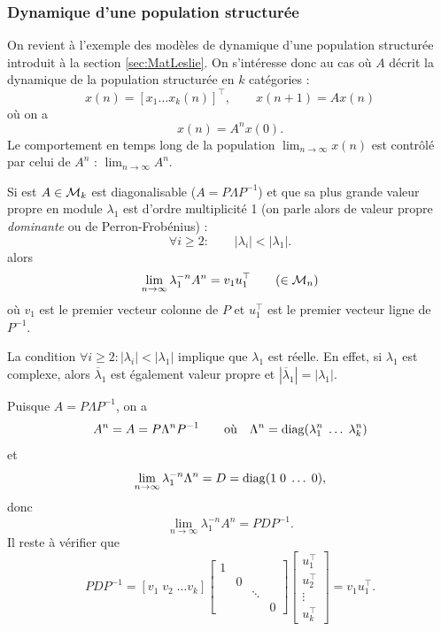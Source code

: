 \subsubsection{Dynamique d'une population structurée}

On revient à l'exemple des modèles de dynamique d'une population structurée introduit à la section \ref{sec:MatLeslie}. On s'intéresse donc au cas où $A$ décrit la dynamique de la population structurée en $k$ catégories : 
$$
x(n) = [x_1 \dots x_k(n)]^\top, \qquad x(n+1) = A x(n)
$$
où on a
$$
x(n) = A^n x(0).
$$
Le comportement en temps long de la population $\lim_{n \to\infty} x(n)$ est contrôlé par celui de $A^n$ : $\lim_{n \to\infty} A^n$.

\begin{proposition}
  Si est $A \in \mathcal{M}_k$ est diagonalisable ($A = P \Lambda P^{-1}$) et que sa plus grande valeur propre en module $\lambda_1$ est d'ordre multiplicité 1 (on parle alors de valeur propre {\em dominante} ou de Perron-Frobénius) :
  $$
  \forall i \geq 2: \qquad |\lambda_i| < |\lambda_1|.
  $$
  alors
  $$
  \lim_{n \to \infty} \lambda_1^{-n} A^n = v_1 u_1^\top \qquad (\in \mathcal{M}_n)
  $$
  où $v_1$ est le premier vecteur colonne de $P$ et $u_1^\top$ est le premier vecteur ligne de $P^{-1}$.
\end{proposition}

\remark
La condition $\forall i \geq 2: |\lambda_i| < |\lambda_1|$ implique que $\lambda_1$ est réelle. En effet, si $\lambda_1$ est complexe, alors $\overline{\lambda}_1$ est également valeur propre et $|\overline{\lambda}_1| = |\lambda_1|$.

\proof
  Puisque $A = P \Lambda P^{-1}$, on a
  $$
  A^n = A = P \Lambda^n P^{-1}
  \qquad \text{où} \quad 
  \Lambda^n = \operatorname{diag}(\lambda_1^n \; \dots \; \lambda_k^n)
  $$
  et 
  $$
  \lim_{n \to \infty} \lambda_1^{-n} \Lambda^n = D = \operatorname{diag}(1 \; 0 \; \dots \; 0),
  $$
  donc
  $$
  \lim_{n \to \infty} \lambda_1^{-n} A^n = P D P^{-1}.
  $$
  Il reste à vérifier que
  $$
  P D P^{-1} 
  = \left[v_1 \; v_2 \; \dots v_k\right] 
  \left[\begin{array}{cccc} 1 & & & \\ & 0 & & \\ & & \ddots & \\ & & & 0 \end{array} \right] 
  \left[\begin{array}{c} u_1^\top \\ u_2^\top \\ \vdots \\ u_k^\top \end{array}\right] 
  = v_1 u_1^\top .
  $$
\eproof

